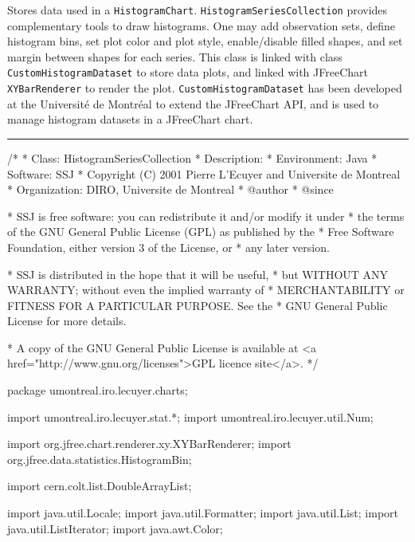 
Stores data used in a \texttt{HistogramChart}. %
\texttt{HistogramSeriesCollection} provides complementary tools to draw histograms.
One may add observation sets, define histogram bins, set plot color and plot style,
enable/disable filled shapes, and set margin between shapes for each series.
%
This class is linked with class \texttt{CustomHistogramDataset} to store data plots,
and linked with JFreeChart \texttt{XYBarRenderer} to render the plot.
\texttt{CustomHistogramDataset} has been developed at the Universit\'
e de Montr\'eal to extend the JFreeChart API,
and is used to manage histogram datasets in a JFreeChart chart.

\bigskip\hrule
\begin{code}
\begin{hide}
/*
 * Class:        HistogramSeriesCollection
 * Description:
 * Environment:  Java
 * Software:     SSJ
 * Copyright (C) 2001  Pierre L'Ecuyer and Universite de Montreal
 * Organization: DIRO, Universite de Montreal
 * @author
 * @since

 * SSJ is free software: you can redistribute it and/or modify it under
 * the terms of the GNU General Public License (GPL) as published by the
 * Free Software Foundation, either version 3 of the License, or
 * any later version.

 * SSJ is distributed in the hope that it will be useful,
 * but WITHOUT ANY WARRANTY; without even the implied warranty of
 * MERCHANTABILITY or FITNESS FOR A PARTICULAR PURPOSE.  See the
 * GNU General Public License for more details.

 * A copy of the GNU General Public License is available at
   <a href="http://www.gnu.org/licenses">GPL licence site</a>.
 */
\end{hide}
package umontreal.iro.lecuyer.charts;\begin{hide}

import   umontreal.iro.lecuyer.stat.*;
import   umontreal.iro.lecuyer.util.Num;

import   org.jfree.chart.renderer.xy.XYBarRenderer;
import   org.jfree.data.statistics.HistogramBin;

import   cern.colt.list.DoubleArrayList;

import   java.util.Locale;
import   java.util.Formatter;
import   java.util.List;
import   java.util.ListIterator;
import   java.awt.Color;\end{hide}


\end{code}
